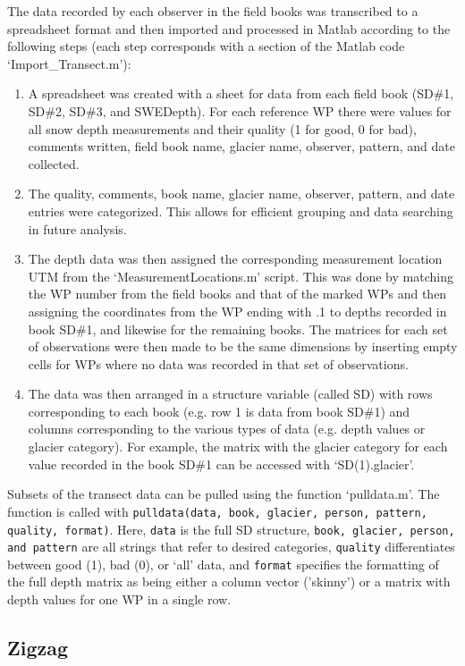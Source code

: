 \documentclass[12pt]{article}
\begin{document}
The data recorded by each observer in the field books was transcribed to a spreadsheet format and then imported and processed in Matlab according to the following steps (each step corresponds with a section of the Matlab code `Import\_Transect.m'):
\begin{enumerate}
\item A spreadsheet was created with a sheet for data from each field book (SD\#1, SD\#2, SD\#3, and SWEDepth). For each reference WP there were values for all snow depth measurements and their quality (1 for good, 0 for bad), comments written, field book name, glacier name, observer, pattern, and date collected.  
\item The quality, comments, book name, glacier name, observer, pattern, and date entries were categorized. This allows for efficient grouping and data searching in future analysis.
\item The depth data was then assigned the corresponding measurement location UTM from the `MeasurementLocations.m' script. This was done by matching the WP number from the field books and that of the marked WPs and then assigning the coordinates from the WP ending with .1 to depths recorded in book SD\#1, and likewise for the remaining books. The matrices for each set of observations were then made to be the same dimensions by inserting empty cells for WPs where no data was recorded in that set of observations. 
\item The data was then arranged in a structure variable (called SD) with rows corresponding to each book (e.g. row 1 is data from book SD\#1) and columns corresponding to the various types of data (e.g. depth values or glacier category). For example, the matrix with the glacier category for each value recorded in the book SD\#1 can be accessed with `SD(1).glacier'.
\end{enumerate}

Subsets of the transect data can be pulled using the function `pulldata.m'. The function is called with \texttt{pulldata(data, book, glacier, person, pattern, quality, format)}. Here, \texttt{data} is the full SD structure, \texttt{book, glacier, person, and pattern} are all strings that refer to desired categories, \texttt{quality} differentiates between good (1), bad (0), or `all' data, and \texttt{format} specifies the formatting of the full depth matrix as being either a column vector ('skinny') or a matrix with depth values for one WP in a single row. 


\subsection{Zigzag}
\end{document}
